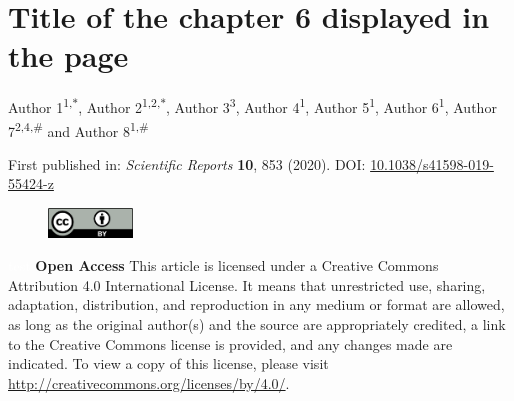 \chapter[Title of the chapter 6 displayed in the table of contents]
    {Title of the chapter 6 displayed in the page
    }
\label{ch:labelchapter6}

\updatemylof %
\updatemylot %

\regularsection
\headerregularsection

Author 1\textsuperscript{1,\textcolor{sophia}{$\ast$}}, Author 2\textsuperscript{1,2,\textcolor{sophia}{$\ast$}}, Author 3\textsuperscript{3}, Author 4\textsuperscript{1}, Author 5\textsuperscript{1}, Author 6\textsuperscript{1}, Author 7\textsuperscript{2,4,\#} and Author 8\textsuperscript{1,\#} \hfill  \newline

\let\thefootnote\relax{}

\noindent First published in: \textit{Scientific Reports} \textbf{10}, 853 (2020). \hfill \break
DOI: \href{https://doi.org/10.1038/s41598-019-55424-z}{10.1038/s41598-019-55424-z} 

\begin{figure}
    \includegraphics[width=0.2\textwidth]{figures/by.png}
\end{figure} 

\noindent \textcolor{white}{test} \newline \textbf{Open Access} This article is licensed under a Creative Commons Attribution 4.0 International License. It means that unrestricted use, sharing, adaptation, distribution, and reproduction in any medium or format are allowed, as long as the original author(s) and the source are appropriately credited, a link to the Creative Commons license is provided, and any changes made are indicated. To view a copy of this license, please visit \href{http://creativecommons.org/licenses/by/4.0/}{http://creativecommons.org/licenses/by/4.0/}. \newline

